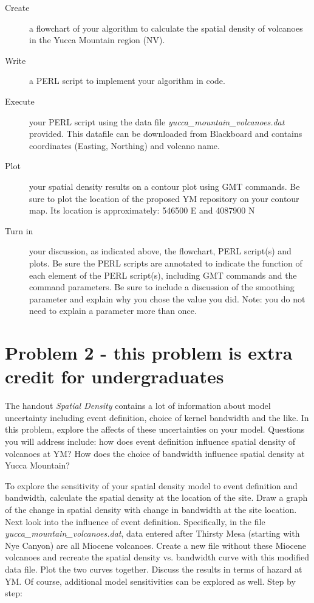 \documentclass[11pt]{article}
\begin{document}
\begin{description}
\item[Create] a flowchart of your algorithm to calculate the spatial density of volcanoes in the Yucca Mountain region (NV). 

\item [Write] a PERL script to implement your algorithm in code.

\item [Execute] your PERL script using the data file {\it yucca\_mountain\_volcanoes.dat} provided. This datafile can be downloaded from Blackboard and contains coordinates (Easting, Northing) and volcano name.

\item[Plot] your spatial density results on a contour plot using GMT commands. Be sure to plot the location of the proposed YM repository on your contour map. Its location is approximately: 546500 E and 4087900 N

\item[Turn in] your discussion, as indicated above, the flowchart, PERL script(s) and plots. Be sure the PERL scripts are annotated to indicate the function of each element of the PERL script(s), including GMT commands and the command parameters. Be sure to include a discussion of the smoothing parameter and explain why you chose the value you did. Note: you do not need to explain a parameter more than once.
\end{description}

\section*{Problem 2 - this problem is extra credit for undergraduates}
The handout {\it Spatial Density} contains a lot of information about model uncertainty including event definition, choice of kernel bandwidth and the like. In this problem, explore the affects of these uncertainties on your model. Questions you will address include: how does event definition influence spatial density of volcanoes at YM? How does the choice of bandwidth influence spatial density at Yucca Mountain? 

To explore the sensitivity of your spatial density model to event definition and bandwidth, calculate the spatial density at the location of the site. Draw a graph of the change in spatial density with change in bandwidth at the site location. Next look into the influence of event definition. Specifically, in the file {\it yucca\_mountain\_volcanoes.dat}, data entered after Thirsty Mesa (starting with Nye Canyon) are all Miocene volcanoes. Create a new file without these Miocene volcanoes and recreate the spatial density vs. bandwidth curve with this modified data file. Plot the two curves together. Discuss the results in terms of hazard at YM. Of course, additional model sensitivities can be explored as well. Step by step:
\end{document}

